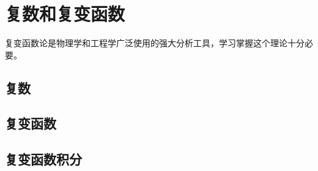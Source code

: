 


\chapter{复数和复变函数}
复变函数论是物理学和工程学广泛使用的强大分析工具，学习掌握这个理论十分必要。
\section{复数}

\section{复变函数}

\label{sec:complexfunctions}





\section{复变函数积分}



